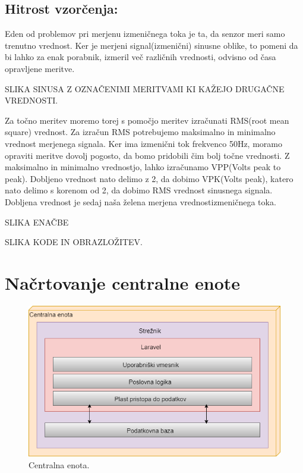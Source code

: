 \documentclass[12pt,a4paper,titlepage,openany]{report}
\begin{document}
\subsection{Hitrost vzorčenja:}
Eden od problemov pri merjenu izmeničnega toka je ta, da senzor meri samo trenutno vrednost. Ker je merjeni signal(izmenični) sinusne oblike, to pomeni da bi lahko za enak porabnik, izmeril več različnih vrednosti, odvisno od časa opravljene meritve.

SLIKA SINUSA Z OZNAČENIMI MERITVAMI KI KAŽEJO DRUGAČNE VREDNOSTI.

Za točno meritev moremo torej s pomočjo meritev izračunati RMS(root mean square) vrednost. Za izračun RMS potrebujemo maksimalno in minimalno vrednost merjenega signala. Ker ima izmenični tok frekvenco 50Hz, moramo opraviti meritve dovolj pogosto, da bomo pridobili čim bolj točne vrednosti. Z maksimalno in minimalno vrednostjo, lahko izračunamo VPP(Volts peak to peak). Dobljeno vrednost nato delimo z 2, da dobimo VPK(Volts peak), katero nato delimo s korenom od 2, da dobimo RMS vrednost sinusnega signala. Dobljena vrednost je sedaj naša želena merjena vrednostizmeničnega toka.

SLIKA ENAČBE

SLIKA KODE IN OBRAZLOŽITEV.


\section{Načrtovanje centralne enote}
\thispagestyle{fancy}

\begin{figure}[H]
\begin{center}
\includegraphics[width=1\linewidth]{Slike/CentralnaEnota.png}
\end{center}
\caption{Centralna enota.}\label{slika:CentralnaEnota}
\end{figure}
\end{document}
